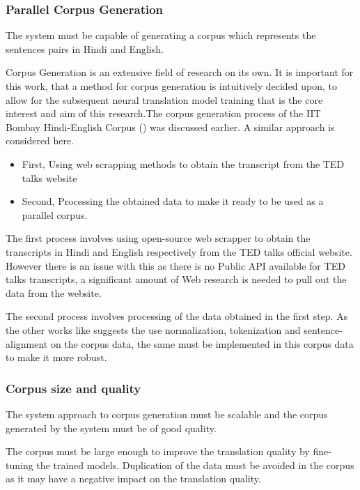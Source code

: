 \subsubsection{Parallel Corpus Generation}

The system must be capable of generating a corpus which represents the sentences pairs in Hindi and English. 

Corpus Generation is an extensive field of research on its own. It is important for this work, that a method for corpus generation is intuitively decided upon, to allow for the subsequent neural translation model training that is the core interest and aim of this research.The corpus generation process of the IIT Bombay Hindi-English Corpus (\cite{Kunchukuttan2018TheIB}) was discussed earlier. A similar approach is considered here.

\begin{itemize}
    \item First, Using web scrapping methods to obtain the transcript from the TED talks website
    \item Second, Processing the obtained data to make it ready to be used as a parallel corpus.
\end{itemize}

The first process involves using open-source web scrapper to obtain the transcripts in Hindi and English respectively from the TED talks official website. However there is an issue with this as there is no Public API available for TED talks transcripts, a significant amount of Web research is needed to pull out the data from the website.

The second process involves processing of the data obtained in the first step. As the other works like \cite{Kunchukuttan2018TheIB} suggests the use normalization, tokenization and sentence-alignment on the corpus data, the same must be implemented in this corpus data to make it more robust.

\subsubsection{Corpus size and quality}

The system approach to corpus generation must be scalable and the corpus generated by the system must be of good quality.

The corpus must be large enough to improve the translation quality by fine-tuning the trained models. Duplication of the data must be avoided in the corpus as it may have a negative impact on the translation quality.

